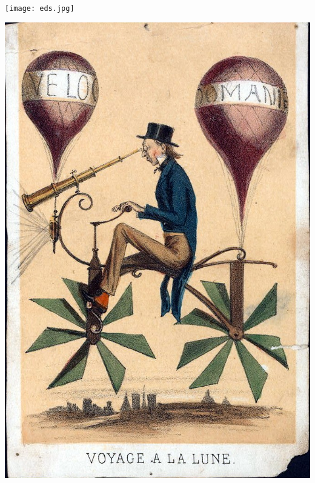 

\vrefwarning
%
\begin{center}
\texttt{[image: eds.jpg]}
\end{center}

\afterpreface 







\newpage
\begin{center}
\includegraphics[width=\linewidth]{Voyage-a-la-lune.jpg}
\end{center}



\begin{appendices}







\end{appendices}

